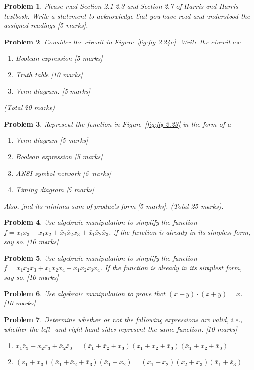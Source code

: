 \documentclass{article}
\newtheorem{prob}{Problem}
\newcommand{\bx}{\bar{x}}
\begin{document}
\begin{prob}
  Please read Section 2.1-2.3 and Section 2.7 of Harris and Harris textbook. Write a statement to acknowledge that you have read and understood the assigned readings [5 marks].
\end{prob}

\begin{prob}
  Consider the circuit in Figure~\ref{fig:fig-2.24a}. Write the circuit as:
  \begin{enumerate}
    \item Boolean expression [5 marks]
    \item Truth table [10 marks]
    \item Venn diagram. [5 marks]
  \end{enumerate} (Total 20 marks)
\end{prob}

\begin{prob}
Represent the function in Figure~\ref{fig:fig-2.23} in the form of a 
\begin{enumerate}
  \item Venn diagram [5 marks]
  \item Boolean expression [5 marks]
  \item ANSI symbol network [5 marks]
  \item Timing diagram [5 marks]
\end{enumerate}
    Also, find its minimal sum-of-products form [5 marks].
    (Total 25 marks).
\end{prob}

\begin{prob}
Use algebraic manipulation to simplify the function $f = x_1x_3 + x_1x_2 + \bx_1 \bx_2 x_3 + \bx_1 \bx_2 \bx_3$. If the function is already in its simplest form, say so. [10 marks]
\end{prob}

\begin{prob}
Use algebraic manipulation to simplify the function $f = x_1 x_2\bx_3 + x_1\bx_2x_4 + x_1\bx_2 x_3\bx_4$. If the function is already in its simplest form, say so. [10 marks]
\end{prob}

\begin{prob}
Use algebraic manipulation to prove that $(x+y)\cdot(x+\bar{y}) = x$. [10 marks].
\end{prob}

\begin{prob}
Determine whether or not the following expressions are valid, i.e., whether the
left- and right-hand sides represent the same function.
[10 marks]
\begin{enumerate}
    \item $x_1 \bx_3 + x_2 x_3 + \bx_2 \bx_3 = (\bx_1 + \bx_2 + x_3)(x_1 + x_2 + \bx_3)(\bx_1 + x_2 + \bx_3)$
    \item $(x_1 + x_3)(\bx_1 + \bx_2 + \bx_3)(\bx_1 + x_2) = (x_1 + x_2)(x_2 + x_3)(\bx_1 + \bx_3)$
\end{enumerate}
\end{prob}
\end{document}
